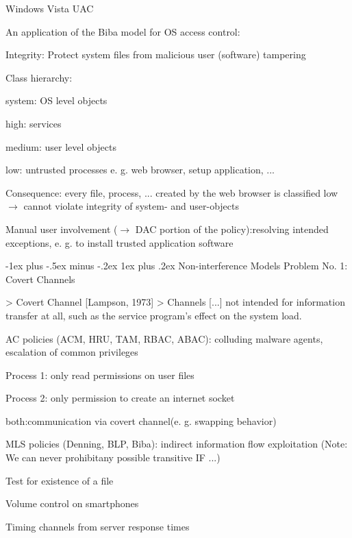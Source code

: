 \documentclass[a4paper]{article}
\makeatletter
\renewcommand{\subsubsection}{\@startsection{subsubsection}{3}{0mm}%
                                {-1ex plus -.5ex minus -.2ex}%
                                {1ex plus .2ex}%
                                {\normalfont\small\bfseries}}
\makeatother
\begin{document}
\begin{multicols}{3}
    Windows Vista UAC
    \begin{itemize*}
        \item An application of the Biba model for OS access control:
        \item Integrity: Protect system files from malicious user (software) tampering
        \item Class hierarchy:
              \begin{itemize*}
                  \item system: OS level objects
                  \item high: services
                  \item medium: user level objects
                  \item low: untrusted processes e. g. web browser, setup application, ...
              \end{itemize*}
        \item Consequence: every file, process, ... created by the web browser is classified low $\rightarrow$ cannot violate integrity of system- and user-objects
        \item Manual user involvement ($\rightarrow$ DAC portion of the policy):resolving intended exceptions, e. g. to install trusted application software
    \end{itemize*}


    \subsubsection{Non-interference Models}
    Problem No. 1: Covert Channels

    > Covert Channel [Lampson, 1973]
    > Channels [...] not intended for information transfer at all, such as the service program’s effect on the system load.

    \begin{itemize*}
        \item AC policies (ACM, HRU, TAM, RBAC, ABAC): colluding malware agents, escalation of common privileges
              \begin{itemize*}
                  \item Process 1: only read permissions on user files
                  \item Process 2: only permission to create an internet socket
                  \item both:communication via covert channel(e. g. swapping behavior)
              \end{itemize*}
        \item MLS policies (Denning, BLP, Biba): indirect information flow exploitation (Note: We can never prohibitany possible transitive IF ...)
              \begin{itemize*}
                  \item Test for existence of a file
                  \item Volume control on smartphones
                  \item Timing channels from server response times
              \end{itemize*}
    \end{itemize*}


\end{multicols}
\end{document}
